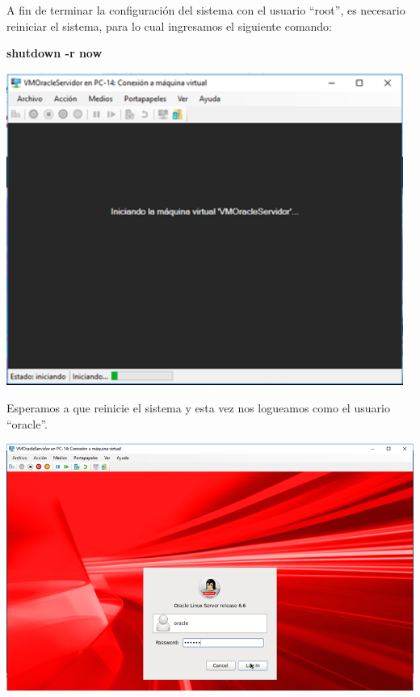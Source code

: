 A fin de terminar la configuración del sistema con el usuario “root”, es necesario reiniciar el sistema, para lo cual ingresamos el siguiente comando:
	\begin{center}
		\textbf{\large shutdown -r now}		
	\end{center}
\begin{center}
	\includegraphics[width=13cm]{./Imagenes/53} 
\end{center} 

\vspace{\baselineskip}

Esperamos a que reinicie el sistema y esta vez nos logueamos como el usuario “oracle”.
\begin{center}
	\includegraphics[width=17cm]{./Imagenes/54} 
\end{center} 

